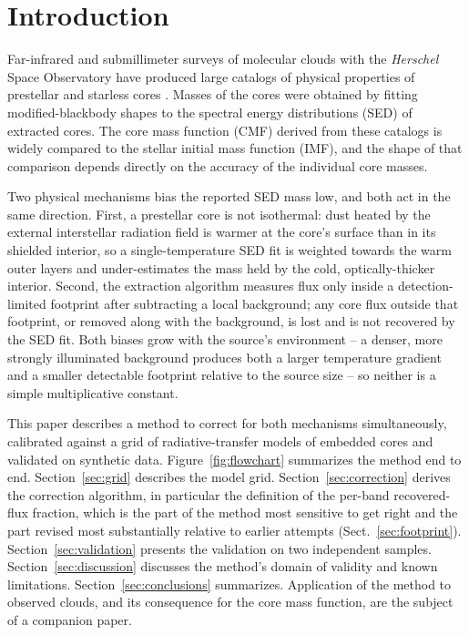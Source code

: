 \documentclass{aa}
\begin{document}
\section{Introduction}
\label{sec:intro}

Far-infrared and submillimeter surveys of molecular clouds with the \emph{Herschel} Space Observatory \citep{Pilbratt_etal2010}
have produced large catalogs of physical properties of prestellar and starless cores \citep[e.g.][]{Andre+2010,Konyves+2015}.
Masses of the cores were obtained by fitting modified-blackbody shapes to the spectral energy distributions (SED) of extracted
cores. The core mass function (CMF) derived from these catalogs is widely compared to the stellar initial mass function (IMF), and
the shape of that comparison depends directly on the accuracy of the individual core masses.

Two physical mechanisms bias the reported SED mass low, and both act in the
same direction. First, a prestellar core is not isothermal: dust heated by
the external interstellar radiation field is warmer at the core's surface
than in its shielded interior, so a single-temperature SED fit is weighted
towards the warm outer layers and under-estimates the mass held by the cold,
optically-thicker interior. Second, the extraction algorithm measures flux
only inside a detection-limited footprint after subtracting a local
background; any core flux outside that footprint, or removed along with the
background, is lost and is not recovered by the SED fit. Both biases grow
with the source's environment -- a denser, more strongly illuminated
background produces both a larger temperature gradient and a smaller
detectable footprint relative to the source size -- so neither is a simple
multiplicative constant.

This paper describes a method to correct for both mechanisms
simultaneously, calibrated against a grid of radiative-transfer models
of embedded cores and validated on synthetic data. Figure~\ref{fig:flowchart}
summarizes the method end to end. Section~\ref{sec:grid} describes the
model grid. Section~\ref{sec:correction} derives the correction algorithm,
in particular the definition of the per-band recovered-flux fraction,
which is the part of the method most sensitive to get right and the part
revised most substantially relative to earlier attempts
(Sect.~\ref{sec:footprint}). Section~\ref{sec:validation} presents the
validation on two independent samples. Section~\ref{sec:discussion}
discusses the method's domain of validity and known limitations.
Section~\ref{sec:conclusions} summarizes. Application of the method to
observed clouds, and its consequence for the core mass function, are the
subject of a companion paper.
\end{document}
